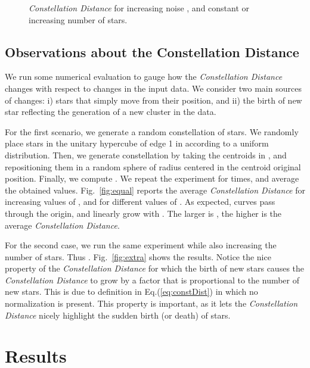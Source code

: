 \documentclass{acm_proc_article-sp}
\newcommand{\distance}{\textit{Constellation Distance}\xspace}
\newcommand{\distintitle}{Constellation Distance\xspace}
\begin{document}
\begin{figure}[t!]
\centering
\hspace*{-0.2cm}
\caption{\distance for increasing noise , and constant or increasing number of stars.}\label{fig:CD}
\end{figure}

\subsection{Observations about the \distintitle}
\label{sec:observation}

We run some numerical evaluation to gauge how the \distance changes with respect to changes in the input data. We consider two main sources of changes: i) stars that simply move from their position, and ii) the birth of new star reflecting the generation of a new cluster in the data.

For the first scenario, we generate a random constellation  of  stars. We randomly place stars in the unitary hypercube of edge 1 in  according to a uniform distribution. Then, we generate constellation  by taking the centroids in , and repositioning them in a random sphere of radius  centered in the centroid original position. Finally, we compute .
We repeat the experiment for  times, and average the obtained values.
Fig.~\ref{fig:equal} reports the average \distance for increasing values of , and for different values of . As expected, curves pass through the origin, and linearly grow with . The larger is , the higher is the average \distance.

For the second case, we run the same experiment while also increasing the number of stars. Thus
.
Fig.~\ref{fig:extra} shows the results. Notice the nice property of the \distance for which the birth of new stars causes the \distance to grow by a factor that is proportional to the number of new stars. This is due to definition in Eq.(\ref{eq:constDist}) in which no normalization is present.
This property is important, as it lets the \distance nicely highlight the sudden birth (or death) of stars.





\section{Results}
\label{sec:results}
\end{document}
